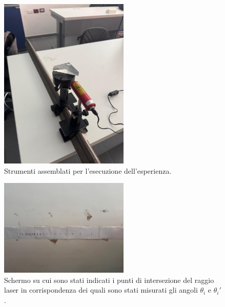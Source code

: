 \begin{figure}[H]
	\centering
	\includegraphics[width=0.55\textwidth]{./figures/apparato}
	\caption{Strumenti assemblati per l'esecuzione dell'esperienza.}
\end{figure}

\begin{figure}[H]
	\centering
	\includegraphics[width=0.55\textwidth]{./figures/nastro}
	\caption{Schermo su cui sono stati indicati i punti di intersezione del raggio laser in corrispondenza dei quali sono stati misurati gli angoli $\theta_i$ e $\theta_i'$.}
\end{figure}